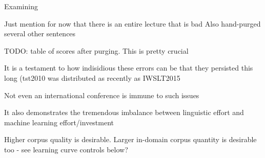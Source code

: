 















Examining 


Just mention for now that there is an entire lecture that is bad
Also hand-purged several other sentences

TODO: table of scores after purging. This is pretty crucial





It is a testament to how indisidious these errors can be that they persisted this long (tst2010 was distributed as recently as IWSLT2015

Not even an international conference is immune to such issues

It also demonstrates the tremendous imbalance between linguistic effort and machine learning effort/investment




Higher corpus quality is desirable.
Larger in-domain corpus quantity is desirable too - see learning curve controls below?


